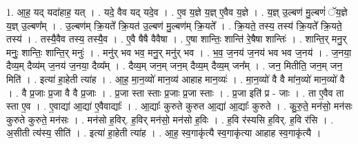 \documentclass[17pt]{extarticle}
\begin{document}
1. आ॒ह॒ यद् यदा॑हाह॒ यत् । . यदे॒ वैव यद् यदे॒व । . ए॒व य॒ज्ञे य॒ज्ञ् ए॒वैव य॒ज्ञे । . य॒ज्ञ् उ॒ल्बण॑ मु॒ल्बणं॑ ॅय॒ज्ञे य॒ज्ञ् उ॒ल्बण᳚म् । . उ॒ल्बण॑म् क्रि॒यते᳚ क्रि॒यत॑ उ॒ल्बण॑ मु॒ल्बण॑म् क्रि॒यते᳚ । . क्रि॒यते॒ तस्य॒ तस्य॑ क्रि॒यते᳚ क्रि॒यते॒ तस्य॑ । . तस्यै॒वैव तस्य॒ तस्यै॒व । . ए॒वै षैषै वैवैषा । . ए॒षा शान्तिः॒ शान्ति॑ रे॒षैषा शान्तिः॑ । . शान्ति॒र् मनु॒र् मनुः॒ शान्तिः॒ शान्ति॒र् मनुः॑ । . मनु॑र् भव भव॒ मनु॒र् मनु॑र् भव । . भ॒व॒ ज॒नय॑ ज॒नय॑ भव भव ज॒नय॑ । . ज॒नया॒ दैव्य॒म् दैव्य॑म् ज॒नय॑ ज॒नया॒ दैव्य᳚म् । . दैव्य॒म् जन॒म् जन॒म् दैव्य॒म् दैव्य॒म् जन᳚म् । . जन॒ मितीति॒ जन॒म् जन॒ मिति॑ । . इत्या॑ हा॒हेती त्या॑ह । . आ॒ह॒ मा॒न॒व्यो॑ मान॒व्य॑ आहाह मान॒व्यः॑ । . मा॒न॒व्यो॑ वै वै मा॑न॒व्यो॑ मान॒व्यो॑ वै । . वै प्र॒जाः प्र॒जा वै वै प्र॒जाः । . प्र॒जा स्ता स्ताः प्र॒जाः प्र॒जा स्ताः । . प्र॒जा इति॑ प्र - जाः । . ता ए॒वैव ता स्ता ए॒व । . ए॒वाद्या॑ आ॒द्या॑ ए॒वैवाद्याः᳚ । . आ॒द्याः᳚ कुरुते कुरुत आ॒द्या॑ आ॒द्याः᳚ कुरुते । . कु॒रु॒ते॒ मन॑सो॒ मन॑सः कुरुते कुरुते॒ मन॑सः । . मन॑सो ह॒विर्. ह॒विर् मन॑सो॒ मन॑सो ह॒विः । . ह॒वि र॑स्यसि ह॒विर्. ह॒वि र॑सि । . अ॒सीती त्य॑स्य॒ सीति॑ । . इत्या॑ हा॒हेती त्या॑ह । . आ॒ह॒ स्व॒गाकृ॑त्यै स्व॒गाकृ॑त्या आहाह स्व॒गाकृ॑त्यै । \newline
\end{document}
